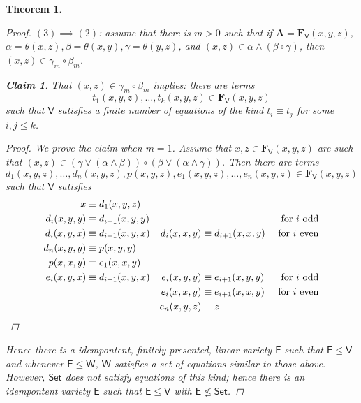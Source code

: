 \documentclass{amsart}
\theoremstyle{plain}
\newtheorem{theorem}{Theorem}[section]
\newtheorem{claim}{Claim}
\theoremstyle{definition}
\theoremstyle{remark}
\begin{document}
\begin{theorem}
\begin{proof}
        $(3) \implies (2)$: assume that there is $m>0$ such that if $\mathbf{A}=\mathbf{F}_{\mathsf{V}}(x,y,z)$, $\alpha=\theta(x,z), \beta=\theta(x,y), \gamma=\theta(y,z)$, 
        and $(x,z) \in \alpha \land (\beta \circ \gamma)$, then $(x,z) \in \gamma_m \circ \beta_m$. 
        \begin{claim}
            That $(x,z) \in \gamma_m \circ \beta_m$ implies: there are terms 
            \begin{equation*}
                t_1(x,y,z), \ldots, t_k(x,y,z) \in \mathbf{F}_{\mathsf{V}}(x,y,z)
            \end{equation*} 
            such that $\mathsf{V}$ satisfies a finite number of equations of the kind
            $t_i \equiv t_j$ for some $i,j \le k$. 
            \begin{proof}
                We prove the claim when $m=1$. 
                Assume that $x,z \in \mathbf{F}_{\mathsf{V}}(x,y,z)$ are such that $(x,z) \in (\gamma \lor (\alpha \land \beta)) \circ (\beta \lor (\alpha \land \gamma))$. 
                Then there are terms 
                \begin{equation*}
                    d_1(x,y,z), \ldots, d_n(x,y,z), p(x,y,z), e_1(x,y,z), \ldots, e_n(x,y,z) \in \mathbf{F}_{\mathsf{V}}(x,y,z)
                \end{equation*}
                such that $\mathsf{V}$ satisfies 
                \begin{align*}
                    x & \equiv d_1(x,y,z) \\
                    d_i(x,y,y) & \equiv d_{i+1}(x,y,y) & & & \text{ for $i$ odd} \\
                    d_i(x,y,x) & \equiv d_{i+1}(x,y,x)  & d_i(x,x,y) & \equiv d_{i+1}(x,x,y) & \text{ for $i$ even} \\
                    d_n(x,y,y) & \equiv p(x,y,y) \\
                    p(x,x,y) & \equiv e_1(x,x,y)\\
                    e_i(x,y,x) & \equiv d_{i+1}(x,y,x)  & e_i(x,y,y) & \equiv e_{i+1}(x,y,y) & \text{ for $i$ odd} \\
                    &  & e_i(x,x,y) & \equiv e_{i+1}(x,x,y) & \text{ for $i$ even} \\
                    & & e_n(x,y,z) & \equiv z &  \qedhere\\
                \end{align*}
            \end{proof}
        \end{claim}
        Hence there is a idempontent, finitely presented, linear variety $\mathsf{E}$ such that $\mathsf{E} \le \mathsf{V}$ and whenever $\mathsf{E} \le \mathsf{W}$, $\mathsf{W}$ satisfies a set of equations similar to those above.
        However, $\mathsf{Set}$ does not satisfy equations of this kind; 
        hence there is an idempontent variety $\mathsf{E}$ such that $\mathsf{E} \le \mathsf{V}$ with $\mathsf{E} \nleq \mathsf{Set}$.
    \end{proof}
\end{theorem}
\end{document}
